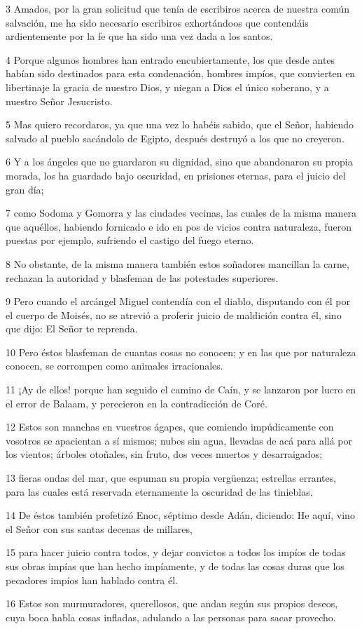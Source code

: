 \par 3 Amados, por la gran solicitud que tenía de escribiros acerca de nuestra común salvación, me ha sido necesario escribiros exhortándoos que contendáis ardientemente por la fe que ha sido una vez dada a los santos.
\par 4 Porque algunos hombres han entrado encubiertamente, los que desde antes habían sido destinados para esta condenación, hombres impíos, que convierten en libertinaje la gracia de nuestro Dios, y niegan a Dios el único soberano, y a nuestro Señor Jesucristo.
\par 5 Mas quiero recordaros, ya que una vez lo habéis sabido, que el Señor, habiendo salvado al pueblo sacándolo de Egipto, después destruyó a los que no creyeron.
\par 6 Y a los ángeles que no guardaron su dignidad, sino que abandonaron su propia morada, los ha guardado bajo oscuridad, en prisiones eternas, para el juicio del gran día;
\par 7 como Sodoma y Gomorra y las ciudades vecinas, las cuales de la misma manera que aquéllos, habiendo fornicado e ido en pos de vicios contra naturaleza, fueron puestas por ejemplo, sufriendo el castigo del fuego eterno.
\par 8 No obstante, de la misma manera también estos soñadores mancillan la carne, rechazan la autoridad y blasfeman de las potestades superiores.
\par 9 Pero cuando el arcángel Miguel contendía con el diablo, disputando con él por el cuerpo de Moisés, no se atrevió a proferir juicio de maldición contra él, sino que dijo: El Señor te reprenda.
\par 10 Pero éstos blasfeman de cuantas cosas no conocen; y en las que por naturaleza conocen, se corrompen como animales irracionales.
\par 11 ¡Ay de ellos! porque han seguido el camino de Caín, y se lanzaron por lucro en el error de Balaam, y perecieron en la contradicción de Coré.
\par 12 Estos son manchas en vuestros ágapes, que comiendo impúdicamente con vosotros se apacientan a sí mismos; nubes sin agua, llevadas de acá para allá por los vientos; árboles otoñales, sin fruto, dos veces muertos y desarraigados;
\par 13 fieras ondas del mar, que espuman su propia vergüenza; estrellas errantes, para las cuales está reservada eternamente la oscuridad de las tinieblas.
\par 14 De éstos también profetizó Enoc, séptimo desde Adán, diciendo: He aquí, vino el Señor con sus santas decenas de millares,
\par 15 para hacer juicio contra todos, y dejar convictos a todos los impíos de todas sus obras impías que han hecho impíamente, y de todas las cosas duras que los pecadores impíos han hablado contra él.
\par 16 Estos son murmuradores, querellosos, que andan según sus propios deseos, cuya boca habla cosas infladas, adulando a las personas para sacar provecho.

